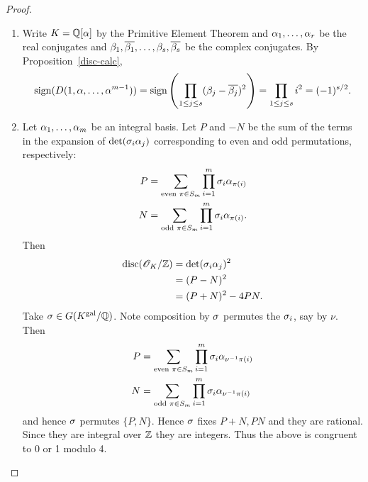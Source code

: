 \begin{proof}
\begin{enumerate}
\item
%
%
%
Write $K=\mathbb{Q}[\alpha]$ by the Primitive Element Theorem and $\alpha_1,\ldots, \alpha_r$ be the real conjugates and $\beta_1,\overline{\beta_1},\ldots, \beta_s,\overline{\beta_s}$ be the complex conjugates. By Proposition~\ref{disc-calc},
\[\operatorname{sign}(D(1,\alpha,\ldots, \alpha^{m-1}))=\operatorname{sign}\left( {\prod_{1\le j\le s} (\beta_j-\overline{\beta_j})^2} \right)=\prod_{1\le j\le s}i^2=(-1)^{s/2}.\]
\item Let $\alpha_1,\ldots, \alpha_m$ be an integral basis. Let $P$ and $-N$ be the sum of the terms in the expansion of $\det(\sigma_i\alpha_j)$ corresponding to even and odd permutations, respectively:
\begin{align*}
P&=\sum_{\text{even }\pi\in S_m}\prod_{i=1}^m\sigma_i\alpha_{\pi(i)}\\
N&=\sum_{\text{odd }\pi\in S_m}\prod_{i=1}^m\sigma_i\alpha_{\pi(i)}.
\end{align*}
Then
\begin{align*}
\operatorname{disc}(\mathscr{O}_K/\mathbb{Z})&=\det(\sigma_i\alpha_j)^2\\
&=(P-N)^2\\
&=(P+N)^2-4PN.
\end{align*}
Take $\sigma\in G(K^{\text{gal}}/\mathbb{Q})$. Note composition by $\sigma$ permutes the $\sigma_i$, say by $\nu$. Then 
\begin{align*}
P&=\sum_{\text{even }\pi\in S_m}\prod_{i=1}^m\sigma_i\alpha_{\nu^{-1}\pi(i)}\\
N&=\sum_{\text{odd }\pi\in S_m}\prod_{i=1}^m\sigma_i\alpha_{\nu^{-1}\pi(i)}\\
\end{align*}
and hence $\sigma$ permutes $\{P,N\}$.
Hence $\sigma$ fixes $P+N,PN$ and they are rational. Since they are integral over $\mathbb{Z}$ they are integers. Thus the above is congruent to 0 or 1 modulo 4.
\end{enumerate}
\end{proof}

